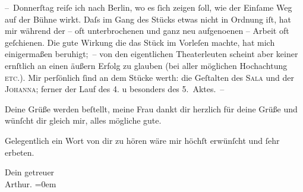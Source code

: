 \pstart
           – Donnerſtag reiſe ich nach Berlin,
               wo es ſich zeigen ſoll, wie der Einſame Weg auf
               der Bühne wirkt. Daſs im Gang des Stücks etwas nicht in Ordnung iſt, hat mir während
               der – oft unterbrochenen und ganz neu aufgeno{\geminationm}enen –
               Arbeit oft geſchienen. Die gute Wirkung {\pb}die das Stück im
               Vorleſen machte, hat mich einigermaßen beruhigt; – von den eigentlichen Theaterleuten
               scheint aber keiner ernſtlich an einen äußern Erfolg zu glauben (bei aller möglichen
               Hochachtung \textsc{etc.}). Mir perſönlich ſind an dem Stücke werth:
               die Geſtalten des \textsc{Sala} und der \textsc{Johanna}; ferner der Lauf des 4. u besonders des 5. Aktes. –\pend
           
\pstart
           Deine Grüße werden beſtellt, meine Frau dankt dir herzlich {\pb}für deine Grüße und
               wünſcht dir gleich mir, alles mögliche gute.\pend
           
\pstart
           Gelegentlich ein Wort von dir zu hören wäre mir höchſt erwünſcht und ſehr
               erbeten.\pend
           
\pstart
           Dein getreuer{\\[\baselineskip]}\spacefill\mbox{Arthur.}\pend
           \leftskip=0em{}\endnumbering{}  
      